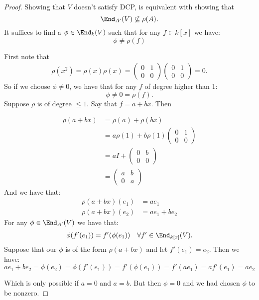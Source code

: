 \begin{proof}
Showing that \(V\) doesn't satisfy DCP, is equivalent with showing that
\[
\End_{A'}(V) \not\subseteq \rho (A).
\]
It suffices to find a \(\phi \in \End_{k}(V)\) such that for any \(f\in k[x]\) we have:
\[
\phi \neq \rho (f)
\]

First note that
\begin{align*}
\rho (x^2)=\rho (x)\rho (x)=\begin{pmatrix}0 & 1 \\ 0 & 0\end{pmatrix}\begin{pmatrix}0 & 1 \\ 0 & 0\end{pmatrix} = 0.
\end{align*}
So if we choose \(\phi \neq 0\), we have that for any \(f\) of degree higher than 1:
\[
\phi  \neq  0 =\rho (f).
\]
Suppose \(\rho \) is of degree \(\leq 1\). Say that \(f=a+bx\). Then

\begin{align*}
\rho (a+bx)&=\rho (a)+\rho (bx)\\ 
&=a\rho (1)+b\rho (1)\begin{pmatrix}0& 1 \\ 0 & 0\end{pmatrix}  \\
&=aI+\begin{pmatrix}0& b \\ 0 & 0\end{pmatrix}  \ \\
&= \begin{pmatrix}a& b \\ 0 & a\end{pmatrix}
\end{align*}
And we have that:
\begin{align*}
\rho (a+bx)(e_{1})&=ae_{1} \\
\rho (a+bx)(e_{2}) &=ae_{1}+be_{2}
\end{align*}
For any \(\phi \in \End_{A'}(V)\) we have that:
\begin{align*}
\phi (f'(e_{1}))=f'(\phi (e_{1}))&& \forall f'\in \End_{k[x]}(V).
\end{align*}
Suppose that our \(\phi \) is of the form \(\rho (a+bx)\) and let \(f'(e_{1})=e_{2}\). Then we have:
\[
ae_{1}+be_{2}= \phi (e_{2})=\phi (f'(e_{1}))=f'(\phi (e_{1}))=f'(ae_{1})=af'(e_{1})=ae_{2}
\]

Which is only possible if \(a=0\) and \(a=b\). But then \(\phi =0\) and we had chosen \(\phi \) to be nonzero.
\end{proof}

